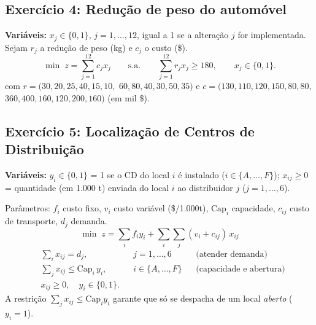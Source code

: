 \documentclass[11pt, a4paper]{article}
\begin{document}
\subsection{Exerc\'icio 4: Redu\c{c}\~ao de peso do autom\'ovel}
\textbf{Vari\'aveis:} $x_j\in\{0,1\}$, $j=1,\dots,12$, igual a 1 se a altera\c{c}\~ao
$j$ for implementada. Sejam $r_j$ a redu\c{c}\~ao de peso (kg) e $c_j$ o custo (\$).
\[
\min\; z=\sum_{j=1}^{12} c_j x_j \qquad\text{s.a.}\qquad
\sum_{j=1}^{12} r_j x_j \ge 180,\qquad x_j\in\{0,1\}.
\]
com $r=(30,20,25,40,15,10,$ $60,80,40,30,50,35)$ e
$c=(130,110,120,150,80,80,$ $360,400,160,120,200,160)$ (em mil \$).

\subsection{Exerc\'icio 5: Localiza\c{c}\~ao de Centros de Distribui\c{c}\~ao}
\textbf{Vari\'aveis:} $y_i\in\{0,1\}$ = 1 se o CD do local $i$ \'e instalado
($i\in\{A,\dots,F\}$); $x_{ij}\ge0$ = quantidade (em 1.000 t) enviada do local $i$
ao distribuidor $j$ ($j=1,\dots,6$).

\noindent Par\^ametros: $f_i$ custo fixo, $v_i$ custo vari\'avel (\$/1.000t),
$\text{Cap}_i$ capacidade, $c_{ij}$ custo de transporte, $d_j$ demanda.
\[
\min\; z=\sum_i f_i y_i + \sum_i\sum_j (v_i+c_{ij})\,x_{ij}
\]
\[
\begin{aligned}
&\sum_i x_{ij} = d_j, && j=1,\dots,6 &&\text{(atender demanda)}\\
&\sum_j x_{ij} \le \text{Cap}_i\, y_i, && i\in\{A,\dots,F\} &&\text{(capacidade e abertura)}\\
&x_{ij}\ge 0,\quad y_i\in\{0,1\}.
\end{aligned}
\]
A restri\c{c}\~ao $\sum_j x_{ij}\le \text{Cap}_i y_i$ garante que s\'o se despacha de um
local \emph{aberto} ($y_i=1$).
\end{document}
